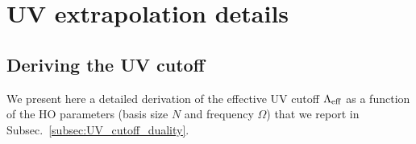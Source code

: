 \cleardoublepage
\chapter{UV extrapolation details}
\label{Appendix:UV_extra_details}

  \section{Deriving the UV cutoff}
  \label{sec:appendix_Lambda-Details}

  We present here a detailed derivation of the effective UV cutoff $\Lambda_{\rm eff}$
  as a function of the HO parameters (basis size $N$ and frequency $\Omega$)
  that we report in Subsec.~\ref{subsec:UV_cutoff_duality}.

